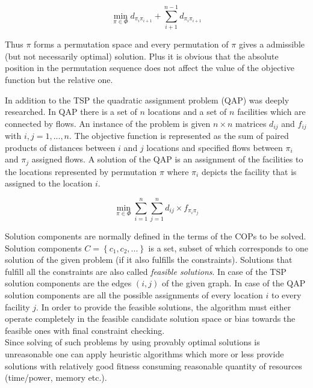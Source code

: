\begin{equation}
\min \limits_{\pi \in \Phi} {d_{\pi_i \pi_{i+1}}} + \sum \limits_{i+1}^{n-1} {d_{\pi_i \pi_{i+1}}}
\end{equation}

Thus $\pi$ forms a permutation space and every permutation of $\pi$ gives a admissible (but not necessarily optimal) solution. Plus it is obvious that the absolute position in the permutation sequence does not affect the value of the objective function but the relative one.

In addition to the TSP the quadratic assignment problem (QAP) was deeply researched. In QAP there is a set of $n$ locations and a set of $n$ facilities which are connected by flows. An instance of the problem is given $n \times n$ matrices $d_{ij}$ and $f_{ij}$ with $i, j = 1,...,n$. The objective function is represented as the sum of paired products of distances between $i$ and $j$ locations and specified flows between $\pi_i$ and $\pi_j$ assigned flows. A solution of the QAP is an assignment of the facilities to the locations represented by permutation $\pi$ where $\pi_i$ depicts the facility that is assigned to the location $i$.

\begin{equation}
\min \limits_{\pi \in \Phi} \sum \limits_{i=1}^n \sum \limits_{j=1}^n {d_{ij} \times f_{\pi_i \pi_j}}
\end{equation}

Solution components are normally defined in the terms of the COPs to be solved. Solution components $C=\left\{c_1,c_2,...\right\}$ is a set, subset of which corresponds to one solution of the given problem (if it also fulfills the constraints). Solutions that fulfill all the constraints are also called \emph{feasible solutions}. In case of the TSP solution components are the edges $(i,j)$ of the given graph. In case of the QAP solution components are all the possible assignments of every location $i$ to every facility $j$. In order to provide the feasible solutions, the algorithm must either operate completely in the feasible candidate solution space or bias towards the feasible ones with final constraint checking. \\

Since solving of such problems by using provably optimal solutions is unreasonable one can apply heuristic algorithms which more or less provide solutions with relatively good fitness consuming reasonable quantity of resources (time/power, memory etc.). \\

